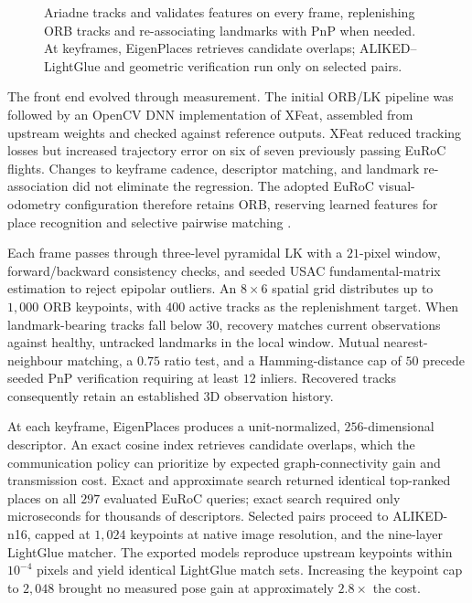 \documentclass[10pt,a4paper]{article}
\begin{document}
\begin{figure}[ht]
{%
}
\caption{Ariadne tracks and validates features on every
frame, replenishing ORB tracks and re-associating landmarks
with PnP when needed. At keyframes, EigenPlaces retrieves
candidate overlaps; ALIKED--LightGlue and geometric
verification run only on selected pairs.}
\label{fig:perception}
\end{figure}

The front end evolved through measurement. The initial ORB/LK pipeline was
followed by an OpenCV DNN implementation of XFeat, assembled from upstream
weights and checked against reference outputs. XFeat reduced tracking losses
but increased trajectory error on six of seven previously passing EuRoC
flights. Changes to keyframe cadence, descriptor matching, and landmark
re-association did not eliminate the regression. The adopted EuRoC
visual-odometry configuration therefore retains ORB, reserving learned
features for place recognition and selective pairwise matching
\cite{orb,xfeat,aliked,lightglue,eigenplaces}.

Each frame passes through three-level pyramidal LK with a $21$-pixel window,
forward/backward consistency checks, and seeded USAC fundamental-matrix
estimation to reject epipolar outliers. An $8\times6$ spatial grid distributes
up to $1{,}000$ ORB keypoints, with $400$ active tracks as the replenishment
target. When landmark-bearing tracks fall below $30$, recovery matches current
observations against healthy, untracked landmarks in the local window.
Mutual nearest-neighbour matching, a $0.75$ ratio test, and a Hamming-distance
cap of $50$ precede seeded PnP verification requiring at least $12$ inliers.
Recovered tracks consequently retain an established 3D observation history.

At each keyframe, EigenPlaces produces a unit-normalized, $256$-dimensional
descriptor. An exact cosine index retrieves candidate overlaps, which the
communication policy can prioritize by expected graph-connectivity gain and
transmission cost. Exact and approximate search returned identical top-ranked
places on all $297$ evaluated EuRoC queries; exact search required only
microseconds for thousands of descriptors. Selected pairs proceed to
ALIKED-n16, capped at $1{,}024$ keypoints at native image resolution, and
the nine-layer LightGlue matcher. The exported models reproduce upstream
keypoints within $10^{-4}$ pixels and yield identical LightGlue match sets.
Increasing the keypoint cap to $2{,}048$ brought no measured pose gain at
approximately $2.8\times$ the cost.
\end{document}
